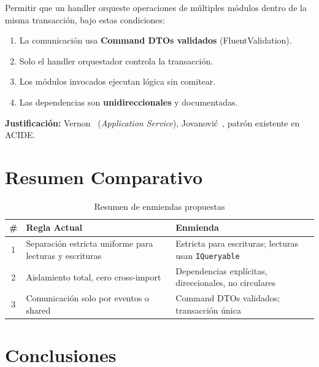 \documentclass[conference]{IEEEtran}
\begin{document}
\begin{proposalbox}[Enmienda 3]
Permitir que un handler orqueste operaciones de m\'ultiples m\'odulos dentro de la misma transacci\'on, bajo estas condiciones:

\begin{enumerate}[leftmargin=1.5em, itemsep=1pt]
    \item La comunicaci\'on usa \textbf{Command DTOs validados} (FluentValidation).
    \item Solo el handler orquestador controla la transacci\'on.
    \item Los m\'odulos invocados ejecutan l\'ogica sin comitear.
    \item Las dependencias son \textbf{unidireccionales} y documentadas.
\end{enumerate}

\medskip
\textbf{Justificaci\'on:} Vernon~\cite{vernon2013} (\textit{Application Service}), Jovanovi\'c~\cite{jovanovic2024}, patr\'on existente en ACIDE.
\end{proposalbox}


\section{Resumen Comparativo}

\begin{table}[htbp]
\centering
\caption{Resumen de enmiendas propuestas}
\label{tab:resumen}
\small
\begin{tabular}{cp{3.3cm}p{3.3cm}}
\toprule
\textbf{\#} & \textbf{Regla Actual} & \textbf{Enmienda} \\
\midrule
1 & Separaci\'on estricta uniforme para lecturas y escrituras & Estricta para escrituras; lecturas usan \texttt{IQueryable} \\
\midrule
2 & Aislamiento total, cero cross-import & Dependencias expl\'icitas, direccionales, no circulares \\
\midrule
3 & Comunicaci\'on solo por eventos o shared & Command DTOs validados; transacci\'on \'unica \\
\bottomrule
\end{tabular}
\end{table}


\section{Conclusiones}
\end{document}
